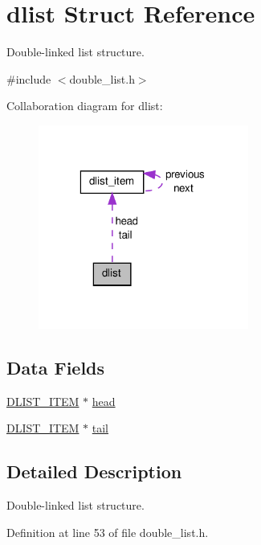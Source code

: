 \hypertarget{structdlist}{}\section{dlist Struct Reference}
\label{structdlist}


Double-\/linked list structure.  




{\ttfamily \#include $<$double\+\_\+list.\+h$>$}



Collaboration diagram for dlist\+:
\nopagebreak
\begin{figure}[H]
\begin{center}
\leavevmode
\includegraphics[width=196pt]{structdlist__coll__graph}
\end{center}
\end{figure}
\subsection*{Data Fields}
\begin{DoxyCompactItemize}
\item 
\hyperlink{double__list_8h_ad2863d2b4efe59432e1868606a5b74b6}{D\+L\+I\+S\+T\+\_\+\+I\+T\+E\+M} $\ast$ \hyperlink{structdlist_a8b41eb6a98fac7979652003285f65313}{head}
\item 
\hyperlink{double__list_8h_ad2863d2b4efe59432e1868606a5b74b6}{D\+L\+I\+S\+T\+\_\+\+I\+T\+E\+M} $\ast$ \hyperlink{structdlist_af47038909dd24dd5205cbb96509a48bf}{tail}
\end{DoxyCompactItemize}


\subsection{Detailed Description}
Double-\/linked list structure. 

Definition at line 53 of file double\+\_\+list.\+h.



